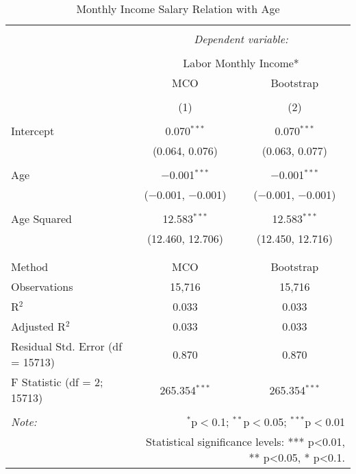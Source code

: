 
\begin{table}[!htbp] \centering 
  \caption{Monthly Income Salary Relation with Age} 
  \label{} 
\begin{tabular}{@{\extracolsep{5pt}}lcc} 
\\[-1.8ex]\hline 
\hline \\[-1.8ex] 
 & \multicolumn{2}{c}{\textit{Dependent variable:}} \\ 
\cline{2-3} 
\\[-1.8ex] & \multicolumn{2}{c}{Labor Monthly Income*} \\ 
 & MCO & Bootstrap \\ 
\\[-1.8ex] & (1) & (2)\\ 
\hline \\[-1.8ex] 
 Intercept & 0.070$^{***}$ & 0.070$^{***}$ \\ 
  & (0.064, 0.076) & (0.063, 0.077) \\ 
  & & \\ 
 Age & $-$0.001$^{***}$ & $-$0.001$^{***}$ \\ 
  & ($-$0.001, $-$0.001) & ($-$0.001, $-$0.001) \\ 
  & & \\ 
 Age Squared & 12.583$^{***}$ & 12.583$^{***}$ \\ 
  & (12.460, 12.706) & (12.450, 12.716) \\ 
  & & \\ 
\hline \\[-1.8ex] 
Method & MCO & Bootstrap \\ 
Observations & 15,716 & 15,716 \\ 
R$^{2}$ & 0.033 & 0.033 \\ 
Adjusted R$^{2}$ & 0.033 & 0.033 \\ 
Residual Std. Error (df = 15713) & 0.870 & 0.870 \\ 
F Statistic (df = 2; 15713) & 265.354$^{***}$ & 265.354$^{***}$ \\ 
\hline 
\hline \\[-1.8ex] 
\textit{Note:}  & \multicolumn{2}{r}{$^{*}$p$<$0.1; $^{**}$p$<$0.05; $^{***}$p$<$0.01} \\ 
 & \multicolumn{2}{r}{Statistical significance levels: *** p<0.01, ** p<0.05, * p<0.1.} \\ 
\end{tabular} 
\end{table} 
